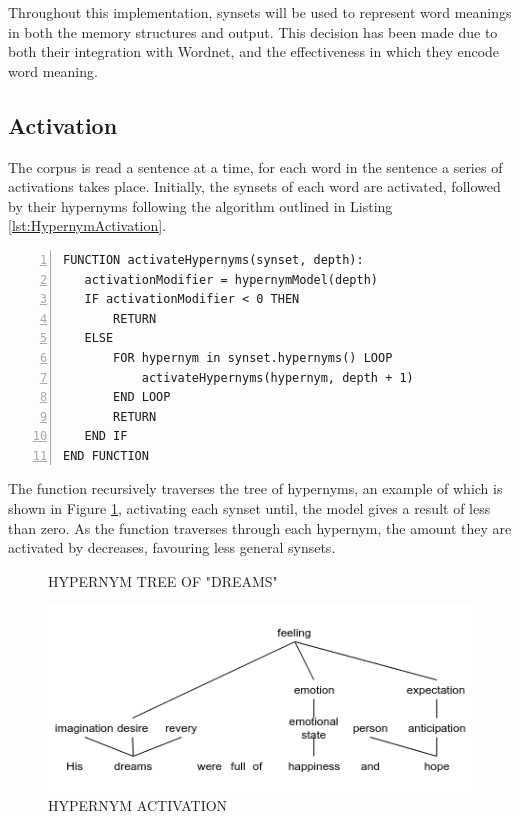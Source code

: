 \documentclass[]{article}
\begin{document}
Throughout this implementation, synsets will be used to represent word meanings in both the memory structures and output. This decision has been made due to both their integration with Wordnet, and the effectiveness in which they encode word meaning. 

\subsection{Activation}
\label{sec:activation} 

The corpus is read a sentence at a time, for each word in the sentence a series of activations takes place. Initially, the synsets of each word are activated, followed by their hypernyms following the algorithm outlined in Listing \ref{lst:HypernymActivation}.

\begin{lstlisting}[numbers=left, numberstyle=\small, caption={Hypernym Activation}, captionpos=b, label={lst:HypernymActivation}]
FUNCTION activateHypernyms(synset, depth):
   activationModifier = hypernymModel(depth)
   IF activationModifier < 0 THEN
       RETURN
   ELSE
       FOR hypernym in synset.hypernyms() LOOP
           activateHypernyms(hypernym, depth + 1)
       END LOOP
       RETURN
   END IF
END FUNCTION
\end{lstlisting}

The function recursively traverses the tree of hypernyms, an example of which is shown in Figure \ref{fig:hypernymTree}, activating each synset until, the model gives a result of less than zero. As the function traverses through each hypernym, the amount they are activated by decreases, favouring less general synsets.

\begin{figure}[h]
\caption{HYPERNYM TREE OF "DREAMS"}
\label{fig:hypernymTree}
\end{figure}

\begin{figure}[h]
	\includegraphics[scale=0.6]{HypernymActivation.png}
	\caption{HYPERNYM ACTIVATION}
	\label{fig:HypernymAct}
\end{figure}
\end{document}
